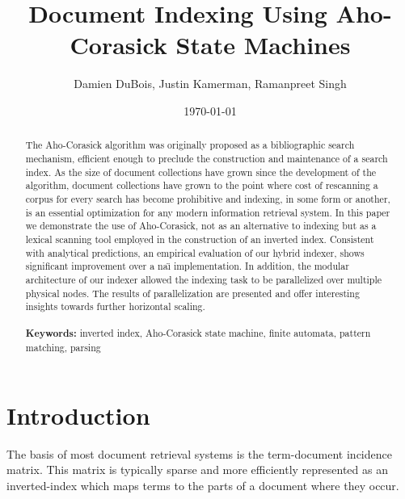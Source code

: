 \documentclass[10pt]{article}
\title{Document Indexing Using Aho-Corasick State Machines}
\author{Damien DuBois, Justin Kamerman, Ramanpreet Singh}
\date{\today}
\begin{document}
\maketitle

\begin{abstract}
The Aho-Corasick algorithm was originally proposed as a bibliographic
search mechanism, efficient enough to preclude the construction and
maintenance of a search index. As the size of document collections
have grown since the development of the algorithm, document
collections have grown to the point where cost of rescanning a corpus
for every search has become prohibitive and indexing, in some form or
another, is an essential optimization for any modern information
retrieval system. In this paper we demonstrate the use of
Aho-Corasick, not as an alternative to indexing but as a lexical
scanning tool employed in the construction of an inverted
index. Consistent with analytical predictions, an empirical evaluation
of our hybrid indexer, shows significant improvement over a
na\"{\i} implementation. In addition, the modular architecture of our indexer
allowed the indexing task to be parallelized over multiple physical
nodes. The results of parallelization are presented and offer
interesting insights towards further horizontal scaling.
\\\\
{\bf Keywords:} inverted index, Aho-Corasick state machine, finite
automata, pattern matching, parsing
\end{abstract}


\section{Introduction}
The basis of most document retrieval systems is the
term-document incidence matrix. This matrix is typically sparse and
more efficiently represented as an inverted-index which maps terms to
the parts of a document where they occur.
\end{document}
